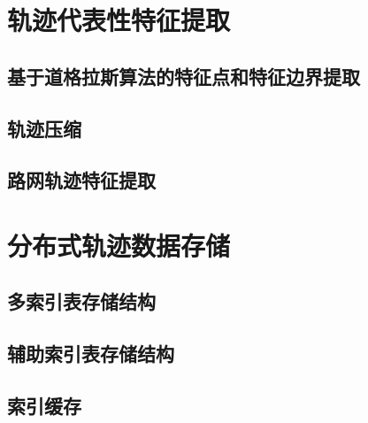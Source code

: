 \section{轨迹代表性特征提取}
\label{sec:feature}
\subsection{基于道格拉斯算法的特征点和特征边界提取}
\subsection{轨迹压缩}
\subsection{路网轨迹特征提取}
\section{分布式轨迹数据存储}
\label{sec:storage}
\subsection{多索引表存储结构}
\subsection{辅助索引表存储结构}
\subsection{索引缓存}

